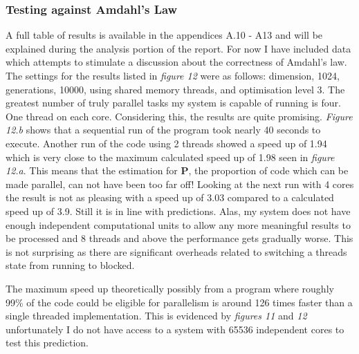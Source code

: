 \documentclass[11pt]{article} %
\begin{document}
\subsubsection{Testing against Amdahl's Law}
A full table of results is available in the appendices A.10 - A13 and will be explained during the analysis portion of the report. For now I have included data which attempts to stimulate a discussion about the correctness of Amdahl's law. The settings for the results listed in {\it figure 12} were as follows: dimension, 1024, generations, 10000, using shared memory threads, and optimisation level 3. The greatest number of truly parallel tasks my system is capable of running is four. One thread on each core. Considering this, the results are quite promising. {\it Figure 12.b} shows that a sequential run of the program took nearly 40 seconds to execute. Another run of the code using 2 threads showed a speed up of 1.94 which is very close to the maximum calculated speed up of 1.98 seen in {\it figure 12.a}. This means that the estimation for {\bf P}, the proportion of code which can be made parallel, can not have been too far off! Looking at the next run with 4 cores the result is not as pleasing with a speed up of 3.03 compared to a calculated speed up of 3.9. Still it is in line with predictions. Alas, my system does not have enough independent computational units to allow any more meaningful results to be processed and 8 threads and above the performance gets gradually worse. This is not surprising as there are significant overheads related to switching a threads state from running to blocked.

The maximum speed up theoretically possibly from a program where roughly 99\% of the code could be eligible for parallelism is around 126 times faster than a single threaded implementation. This is evidenced by {\it figures 11} and {\it 12} unfortunately I do not have access to a system with 65536 independent cores to test this prediction.
\end{document}
